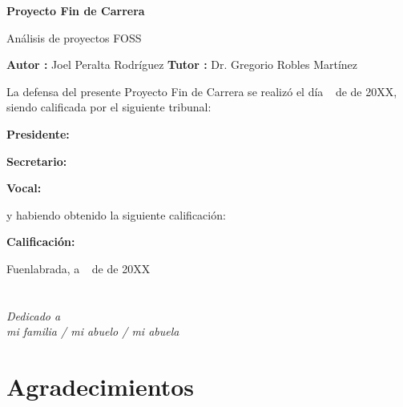 \documentclass[a4paper, spanish, 12pt]{book}
\begin{document}
\vspace{-4cm}
\begin{center}
\LARGE
\textbf{Proyecto Fin de Carrera}

\vspace{1cm}
\large
An\'alisis de proyectos FOSS

\vspace{1cm}
\large
\textbf{Autor :} Joel Peralta Rodr\'iguez
\textbf{Tutor :} Dr. Gregorio Robles Mart\'inez

\end{center}

\vspace{1cm}
La defensa del presente Proyecto Fin de Carrera se realiz\'o el d\'ia \qquad$\;\,$ de \qquad\qquad\qquad\qquad \newline de 20XX, siendo calificada por el siguiente tribunal:


\vspace{0.5cm}
\textbf{Presidente:}

\vspace{1.2cm}
\textbf{Secretario:}

\vspace{1.2cm}
\textbf{Vocal:}


\vspace{1.2cm}
y habiendo obtenido la siguiente calificaci\'on:

\vspace{1cm}
\textbf{Calificaci\'on:}


\vspace{1cm}
\begin{flushright}
Fuenlabrada, a \qquad$\;\,$ de \qquad\qquad\qquad\qquad de 20XX
\end{flushright}


\chapter*{}
\begin{flushright}
\textit{Dedicado a \\
mi familia / mi abuelo / mi abuela}
\end{flushright}


\chapter*{Agradecimientos}
\end{document}
